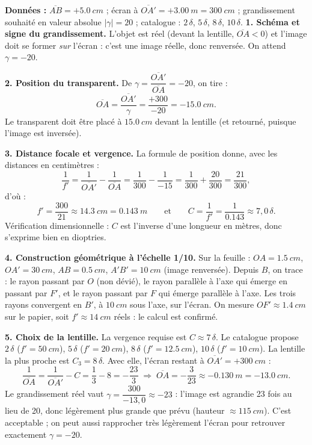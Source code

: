 \documentclass[11pt]{article}
\newcounter{popsec}
\newcounter{popsub}
\newcommand{\courssub}[1]{%
  \stepcounter{popsub}%
  \par\vspace{9pt}\noindent{\popxbold\fontsize{11.5}{13}\selectfont\color{popink}{\color{poporange}\thepopsec.\thepopsub}\hspace{6pt}#1}\par\nopagebreak\vspace{4pt}
}
\begin{document}
\courssub{Démarche et corrigé commenté}

\begin{exoresolu}
\textbf{Données :} $\overline{AB} = +\SI{5,0}{cm}$ ; écran à $\overline{OA'} = +\SI{3,00}{m} = \SI{300}{cm}$ ; grandissement souhaité en valeur absolue $|\gamma| = 20$ ; catalogue : $2\,\delta$, $5\,\delta$, $8\,\delta$, $10\,\delta$.
\tcblower
\textbf{1. Schéma et signe du grandissement.} L'objet est réel (devant la lentille, $\overline{OA}<0$) et l'image doit se former \emph{sur} l'écran : c'est une image réelle, donc renversée. On attend $\gamma = -20$.

\textbf{2. Position du transparent.} De $\gamma = \dfrac{\overline{OA'}}{\overline{OA}} = -20$, on tire :
\[ \overline{OA} = \frac{\overline{OA'}}{\gamma} = \frac{+300}{-20} = \SI{-15,0}{cm}. \]
Le transparent doit être placé à $\SI{15,0}{cm}$ devant la lentille (et retourné, puisque l'image est inversée).

\textbf{3. Distance focale et vergence.} La formule de position donne, avec les distances en centimètres :
\[ \frac{1}{f'} = \frac{1}{\overline{OA'}} - \frac{1}{\overline{OA}} = \frac{1}{300} - \frac{1}{-15} = \frac{1}{300} + \frac{20}{300} = \frac{21}{300}, \]
d'où :
\[ f' = \frac{300}{21} \approx \SI{14,3}{cm} = \SI{0,143}{m} \qquad\text{et}\qquad C = \frac{1}{f'} = \frac{1}{\num{0,143}} \approx 7,0\,\delta. \]
Vérification dimensionnelle : $C$ est l'inverse d'une longueur en mètres, donc s'exprime bien en dioptries.

\textbf{4. Construction géométrique à l'échelle 1/10.} Sur la feuille : $OA = \SI{1,5}{cm}$, $OA' = \SI{30}{cm}$, $AB = \SI{0,5}{cm}$, $A'B' = \SI{10}{cm}$ (image renversée). Depuis $B$, on trace : le rayon passant par $O$ (non dévié), le rayon parallèle à l'axe qui émerge en passant par $F'$, et le rayon passant par $F$ qui émerge parallèle à l'axe. Les trois rayons convergent en $B'$, à $\SI{10}{cm}$ sous l'axe, sur l'écran. On mesure $OF' \approx \SI{1,4}{cm}$ sur le papier, soit $f' \approx \SI{14}{cm}$ réels : le calcul est confirmé.

\textbf{5. Choix de la lentille.} La vergence requise est $C \approx 7\,\delta$. Le catalogue propose $2\,\delta$ ($f' = \SI{50}{cm}$), $5\,\delta$ ($f' = \SI{20}{cm}$), $8\,\delta$ ($f' = \SI{12,5}{cm}$), $10\,\delta$ ($f' = \SI{10}{cm}$). La lentille la plus proche est $C_3 = 8\,\delta$. Avec elle, l'écran restant à $\overline{OA'} = +\SI{300}{cm}$ :
\[ \frac{1}{\overline{OA}} = \frac{1}{\overline{OA'}} - C = \frac{1}{3} - 8 = -\frac{23}{3} \;\Rightarrow\; \overline{OA} = -\frac{3}{23} \approx \SI{-0,130}{m} = \SI{-13,0}{cm}. \]
Le grandissement réel vaut $\gamma = \dfrac{300}{-13,0} \approx -23$ : l'image est agrandie 23 fois au lieu de 20, donc légèrement plus grande que prévu (hauteur $\approx \SI{115}{cm}$). C'est acceptable ; on peut aussi rapprocher très légèrement l'écran pour retrouver exactement $\gamma = -20$.


\end{exoresolu}
\end{document}
